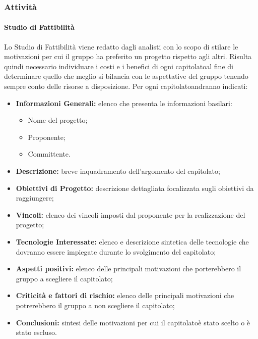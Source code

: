 \subsubsection{Attività}
\paragraph{Studio di Fattibilità}
Lo Studio di Fattibilità viene redatto dagli analisti con lo scopo di stilare le motivazioni per cui il gruppo ha preferito un progetto rispetto agli altri.
Risulta quindi necessario individuare i costi e i benefici di ogni capitolato\glosp al fine di determinare quello che meglio si bilancia con le aspettative del gruppo tenendo sempre conto delle risorse a disposizione.
Per ogni capitolato\glosp andranno indicati:
\begin{itemize}
	\item \textbf{Informazioni Generali:} elenco che presenta le informazioni basilari: 
	\begin{itemize}
		\item Nome del progetto;
		\item Proponente;
		\item Committente.
	\end{itemize} 
	\item \textbf{Descrizione:} breve inquadramento dell'argomento del capitolato\glosp;
	\item \textbf{Obiettivi di Progetto:} descrizione dettagliata focalizzata sugli obiettivi da raggiungere;
	\item \textbf{Vincoli:} elenco dei vincoli imposti dal proponente per la realizzazione del progetto;
	\item \textbf{Tecnologie Interessate:} elenco e descrizione sintetica delle tecnologie che dovranno essere impiegate durante lo svolgimento del capitolato\glo;
	\item \textbf{Aspetti positivi:} elenco delle principali motivazioni che porterebbero il gruppo a scegliere il capitolato\glo;
	\item \textbf{Criticità e fattori di rischio:} elenco delle principali motivazioni che potrerebbero il gruppo a non scegliere il capitolato\glo;
	\item \textbf{Conclusioni:} sintesi delle motivazioni per cui il capitolato\glosp è stato scelto o è stato escluso.
\end{itemize}
